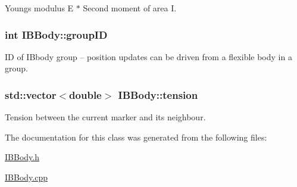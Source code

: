 Young\textquotesingle{}s modulus E $\ast$ Second moment of area I. 

\subsubsection[{\texorpdfstring{group\+ID}{groupID}}]{\setlength{\rightskip}{0pt plus 5cm}int I\+B\+Body\+::group\+ID\hspace{0.3cm}{\ttfamily [protected]}}\hypertarget{class_i_b_body_a4674ade74a2b55ce60a656acfebb4a55}{}\label{class_i_b_body_a4674ade74a2b55ce60a656acfebb4a55}


ID of I\+Bbody group -- position updates can be driven from a flexible body in a group. 

\subsubsection[{\texorpdfstring{tension}{tension}}]{\setlength{\rightskip}{0pt plus 5cm}std\+::vector$<$double$>$ I\+B\+Body\+::tension\hspace{0.3cm}{\ttfamily [protected]}}\hypertarget{class_i_b_body_ab786e24bc2b303eefcf286e0138cb2d1}{}\label{class_i_b_body_ab786e24bc2b303eefcf286e0138cb2d1}


Tension between the current marker and its neighbour. 



The documentation for this class was generated from the following files\+:\begin{DoxyCompactItemize}
\item 
\hyperlink{_i_b_body_8h}{I\+B\+Body.\+h}\item 
\hyperlink{_i_b_body_8cpp}{I\+B\+Body.\+cpp}\end{DoxyCompactItemize}
